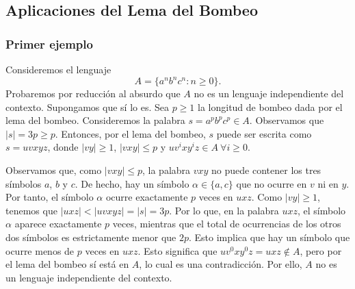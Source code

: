 \documentclass[twoside]{article}
\begin{document}
\subsection{Aplicaciones del Lema del Bombeo}
\subsubsection{Primer ejemplo}
Consideremos el lenguaje $$A=\{a^nb^nc^n: n\geq 0\}.$$
Probaremos por reducción al absurdo que $A$ no es un lenguaje independiente del contexto. Supongamos que sí lo es. Sea $p\geq 1$ la longitud de bombeo dada por el lema del bombeo. Consideremos la palabra $s=a^pb^pc^p\in A$. Observamos que $|s|=3p\geq p$. Entonces, por el lema del bombeo, $s$ puede ser escrita como $s=uvxyz$, donde $|vy|\geq 1$, $|vxy|\leq p$ y $uv^ixy^iz\in A\ \forall i\geq 0$. 

Observamos que, como $|vxy|\leq p$, la palabra $vxy$ no puede contener los tres símbolos $a$, $b$ y $c$. De hecho, hay un símbolo $\alpha\in\{a,c\}$ que no ocurre en $v$ ni en $y$. Por tanto, el símbolo $\alpha$ ocurre exactamente $p$ veces en $uxz$. Como $|vy|\geq 1$, tenemos que $|uxz|<|uvxyz|=|s|=3p$. Por lo que, en la palabra $uxz$, el símbolo $\alpha$ aparece exactamente $p$ veces, mientras que el total de ocurrencias de los otros dos símbolos es estrictamente menor que $2p$. Esto implica que hay un símbolo que ocurre menos de $p$ veces en $uxz$. Esto significa que $uv^0xy^0z=uxz\notin A$, pero por el lema del bombeo sí está en $A$, lo cual es una contradicción. Por ello, $A$ no es un lenguaje independiente del contexto.
\end{document}
